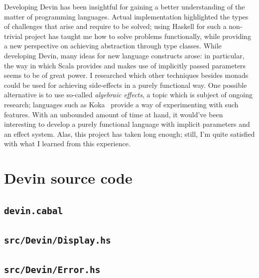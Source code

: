 \documentclass[UdineBachThesis,american,11pt]{PhdThesis}
\begin{document}
  Developing Devin has been insightful for gaining a better understanding of the
  matter of programming languages. Actual implementation highlighted the types
  of challenges that arise and require to be solved; using Haskell for such a
  non-trivial project has taught me how to solve problems functionally, while
  providing a new perspective on achieving abstraction through type classes.
  While developing Devin, many ideas for new language constructs arose: in
  particular, the way in which Scala provides and makes use of implicitly passed
  parameters seems to be of great power. I researched which other techniques
  besides monads could be used for achieving side-effects in a purely functional
  way. One possible alternative is to use so-called \emph{algebraic effects}, a
  topic which is subject of ongoing research; languages such as Koka~\cite{koka}
  provide a way of experimenting with such features. With an unbounded amount of
  time at hand, it would've been interesting to develop a purely functional
  language with implicit parameters and an effect system. Alas, this project has
  taken long enough; still, I'm quite satisfied with what I learned from this
  experience.

  \backmatter

  \appendix

  \chapter{Devin source code}
  \label{chapter:devin-source-code}

  \section{\texttt{devin.cabal}}

  \vspace{\prevdepth-\depthof{\strut}}

  \section{\texttt{src/Devin/Display.hs}}

  \vspace{\prevdepth-\depthof{\strut}}

  \section{\texttt{src/Devin/Error.hs}}
\end{document}
